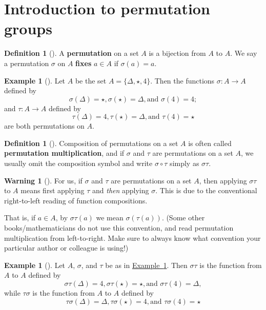 \documentclass[10pt,]{book}
\newcommand{\terminology}[1]{\textbf{#1}}
\theoremstyle{plain}
\theoremstyle{definition}
\newtheorem{definition}[theorem]{Definition}
\theoremstyle{definition}
\newtheorem{warning}[theorem]{Warning}
\theoremstyle{definition}
\newtheorem{example}[theorem]{Example}
\theoremstyle{definition}
\numberwithin{equation}{section}
\begin{document}
\section[{Introduction to permutation groups}]{Introduction to permutation groups}\label{section-17}
\begin{definition}[{}]\label{definition-41}
A \terminology{permutation} on a set \(A\) is a bijection from \(A\) to \(A\). We say a permutation \(\sigma\) on \(A\) \terminology{fixes} \(a\in
A\) if \(\sigma(a)=a\).%
\end{definition}
\begin{example}[]\label{stperm}
Let \(A\) be the set \(A=\{\Delta, \star, 4\}\). Then the functions \(\sigma : A\to A\) defined by%
\begin{equation*}
\sigma(\Delta)=\star,
\sigma(\star)=\Delta,  \mbox{and }  \sigma(4)=4;
\end{equation*}
and \(\tau : A\to A\) defined by%
\begin{equation*}
\tau(\Delta)=4, 
\tau(\star)=\Delta,  \mbox{and }  \tau(4)=\star
\end{equation*}
are both permutations on \(A\).%
\end{example}
\begin{definition}[{}]\label{definition-42}
Composition of permutations on a set \(A\) is often called \terminology{permutation multiplication}, and if \(\sigma\) and \(\tau\) are permutations on a set \(A\), we usually omit the composition symbol and write \(\sigma \circ \tau\) simply as \(\sigma \tau\).%
\end{definition}
\begin{warning}[]\label{warning-19}
For us, if \(\sigma\) and \(\tau\) are permutations on a set \(A\), then applying \(\sigma \tau\) to \(A\) means first applying \(\tau\) and \emph{then} applying \(\sigma\). This is due to the conventional right-to-left reading of function compositions.%
\end{warning}
That is, if \(a\in A\), by \(\sigma \tau(a)\) we mean \(\sigma(\tau(a))\). (Some other books/mathematicians do not use this convention, and read permutation multiplication from left-to-right. Make sure to always know what convention your particular author or colleague is using!)%
\begin{example}[]\label{example-49}
Let \(A\), \(\sigma\), and \(\tau\) be as in \hyperref[stperm]{Example~\ref{stperm}}. Then \(\sigma \tau\) is the function from \(A\) to \(A\) defined by%
\begin{equation*}
\sigma \tau(\Delta)=4,  \sigma \tau(\star)=\star,  \mbox{and }  \sigma \tau(4)=\Delta,
\end{equation*}
while \(\tau \sigma\) is the function from \(A\) to \(A\) defined by%
\begin{equation*}
\tau \sigma (\Delta)=\Delta,  \tau \sigma (\star)=4,  \mbox{and }  \tau \sigma(4)=\star
\end{equation*}
%
\end{example}
\end{document}
